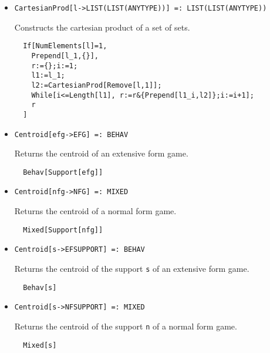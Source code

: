 \begin{itemize}

\item{}
\protect \large \begin{verbatim}
CartesianProd[l->LIST(LIST(ANYTYPE))] =: LIST(LIST(ANYTYPE)) 
\end{verbatim}\normalsize

\bd 
Constructs the cartesian product of a set of sets.  
\begin{verbatim}
  If[NumElements[l]=1,
    Prepend[l_1,{}],
    r:={};i:=1;
    l1:=l_1;
    l2:=CartesianProd[Remove[l,1]];
    While[i<=Length[l1], r:=r&{Prepend[l1_i,l2]};i:=i+1];
    r
  ]
\end{verbatim} 
\ed
	

\item{}
\protect \large \begin{verbatim}
Centroid[efg->EFG] =: BEHAV 
\end{verbatim}\normalsize

\bd 
Returns the centroid of an extensive form game.  
\begin{verbatim}
  Behav[Support[efg]]
\end{verbatim} 
\ed

\item{}
\protect \large \begin{verbatim}
Centroid[nfg->NFG] =: MIXED 
\end{verbatim}\normalsize

\bd 
Returns the centroid of a normal form game.  
\begin{verbatim}
  Mixed[Support[nfg]]
\end{verbatim} 
\ed

\item{}
\protect \large \begin{verbatim}
Centroid[s->EFSUPPORT] =: BEHAV 
\end{verbatim}\normalsize

\bd 
Returns the centroid of the support \verb+s+ of an extensive form game.  
\begin{verbatim}
  Behav[s]
\end{verbatim} 
\ed

\item{}
\protect \large \begin{verbatim}
Centroid[s->NFSUPPORT] =: MIXED 
\end{verbatim}\normalsize

\bd 
Returns the centroid of the support \verb+n+ of a normal form game.  
\begin{verbatim}
  Mixed[s]
\end{verbatim} 
\ed


\end{itemize}
